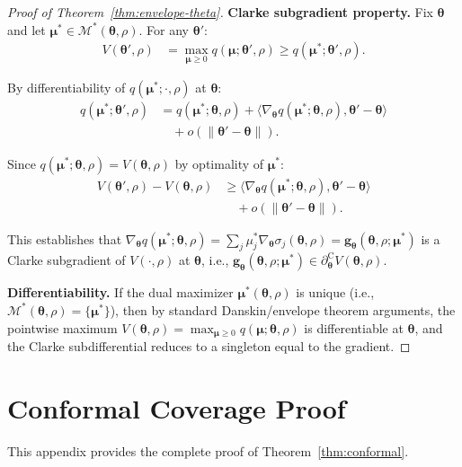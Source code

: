 \documentclass[lettersize,journal]{IEEEtran}
\newcommand{\ip}[2]{\langle #1, #2 \rangle}
\newcommand{\norm}[1]{\|#1\|}
\newcommand{\btheta}{\bm{\theta}}
\newcommand{\bmu}{\bm{\mu}}
\newcommand{\bg}{\bm{g}}
\newcommand{\clsubd}{\partial^{\mathrm{C}}} %
\newcommand{\cM}{\mathcal{M}} %
\theoremstyle{definition}
\begin{document}
\begin{proof}[Proof of Theorem~\ref{thm:envelope-theta}]
\textbf{Clarke subgradient property.} Fix $\btheta$ and let $\bmu^* \in \cM^*(\btheta, \rho)$. For any $\btheta'$:
\begin{align}
V(\btheta', \rho) &= \max_{\bmu \geq 0} q(\bmu; \btheta', \rho) \geq q(\bmu^*; \btheta', \rho).
\end{align}

By differentiability of $q(\bmu^*; \cdot, \rho)$ at $\btheta$:
\begin{align}
q(\bmu^*; \btheta', \rho) &= q(\bmu^*; \btheta, \rho) + \ip{\nabla_{\btheta} q(\bmu^*; \btheta, \rho)}{\btheta' - \btheta} \nonumber \\
&\quad + o(\norm{\btheta' - \btheta}).
\end{align}

Since $q(\bmu^*; \btheta, \rho) = V(\btheta, \rho)$ by optimality of $\bmu^*$:
\begin{align}
V(\btheta', \rho) - V(\btheta, \rho) &\geq \ip{\nabla_{\btheta} q(\bmu^*; \btheta, \rho)}{\btheta' - \btheta} \nonumber \\
&\quad + o(\norm{\btheta' - \btheta}).
\end{align}

This establishes that $\nabla_{\btheta} q(\bmu^*; \btheta, \rho) = \sum_j \mu_j^* \nabla_{\btheta} \sigma_j(\btheta, \rho) = \bg_{\btheta}(\btheta, \rho;\bmu^*)$ is a Clarke subgradient of $V(\cdot, \rho)$ at $\btheta$, i.e., $\bg_{\btheta}(\btheta,\rho;\bmu^*) \in \clsubd_{\btheta} V(\btheta,\rho)$.

\textbf{Differentiability.} If the dual maximizer $\bmu^*(\btheta, \rho)$ is unique (i.e., $\cM^*(\btheta,\rho) = \{\bmu^*\}$), then by standard Danskin/envelope theorem arguments, the pointwise maximum $V(\btheta, \rho) = \max_{\bmu \geq 0} q(\bmu; \btheta, \rho)$ is differentiable at $\btheta$, and the Clarke subdifferential reduces to a singleton equal to the gradient.
\end{proof}

\section{Conformal Coverage Proof}
\label{app:conformal-proof}

This appendix provides the complete proof of Theorem~\ref{thm:conformal}.
\end{document}
